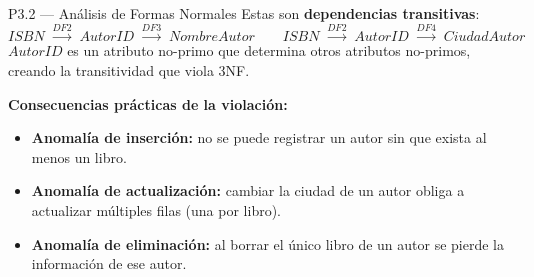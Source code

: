 \documentclass[12pt,a4paper]{article}
\begin{document}
\begin{querybox}{P3.2 --- Análisis de Formas Normales}
Estas son \textbf{dependencias transitivas}:
\[
  ISBN \;\xrightarrow{DF2}\; AutorID \;\xrightarrow{DF3}\; NombreAutor
  \qquad
  ISBN \;\xrightarrow{DF2}\; AutorID \;\xrightarrow{DF4}\; CiudadAutor
\]
$AutorID$ es un atributo no-primo que determina otros atributos no-primos,
creando la transitividad que viola 3NF.

\vspace{0.4cm}
\textbf{Consecuencias prácticas de la violación:}
\begin{itemize}[leftmargin=1.5em,itemsep=2pt]
  \item \textbf{Anomalía de inserción:} no se puede registrar un autor
        sin que exista al menos un libro.
  \item \textbf{Anomalía de actualización:} cambiar la ciudad de un autor
        obliga a actualizar múltiples filas (una por libro).
  \item \textbf{Anomalía de eliminación:} al borrar el único libro de un
        autor se pierde la información de ese autor.
\end{itemize}

\end{querybox}

\vspace{0.6cm}
\end{document}
